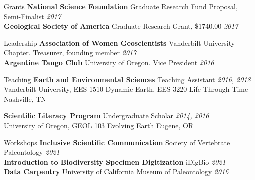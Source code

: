 \documentclass{resume} %
\begin{document}
		\begin{rSection}{Grants}
		{\bf National Science Foundation }{Graduate Research Fund Proposal, Semi-Finalist} \hfill {\em 2017} \\
		{\bf Geological Society of America }{Graduate Research Grant, \$1740.00} \hfill {\em 2017}
	\end{rSection}	
	
		\begin{rSection}{Leadership}
		{\bf Association of Women Geoscientists }{Vanderbilt University Chapter. Treasurer, founding member} \hfill {\em 2017} \\
		{\bf Argentine Tango Club }{University of Oregon. Vice President} \hfill {\em 2016}
	\end{rSection}
	
	\begin{rSection}{Teaching}
		{\bf Earth and Environmental Sciences }{Teaching Assistant} \hfill {\em 2016, 2018} \\
		{Vanderbilt University, EES 1510 Dynamic Earth, EES 3220 Life Through Time} \hfill {Nashville, TN}
		
		{\bf Scientific Literacy Program }{Undergraduate Scholar} \hfill {\em 2014, 2016} \\
		{University of Oregon, GEOL 103 Evolving Earth} \hfill {Eugene, OR}
	\end{rSection}
	
	\begin{rSection}{Workshops}
		{\bf Inclusive Scientific Communication} Society of Vertebrate Paleontology \hfill {\em 2021} \\
		{\bf Introduction to Biodiversity Specimen Digitization} iDigBio \hfill {\em 2021} \\
		{\bf Data Carpentry} University of California Museum of Paleontology \hfill {\em 2016}
	\end{rSection}
\end{document}
